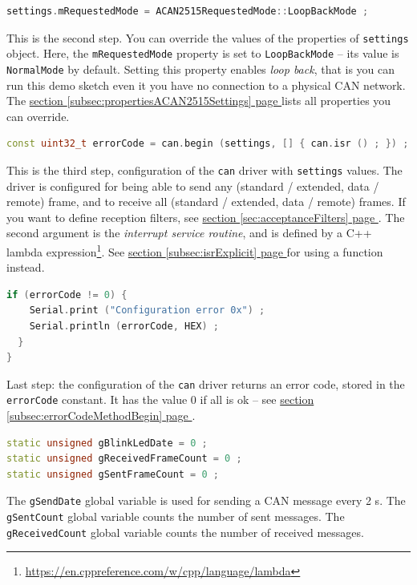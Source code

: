 \documentclass[10pt, a4paper, obeyspaces, openany]{extarticle}
\newcommand\refSectionPage[1]{\hyperref[sec:#1]{section \ref*{sec:#1} page \pageref{sec:#1}}}
\newcommand\refSubsectionPage[1]{\hyperref[subsec:#1]{section \ref*{subsec:#1} page \pageref{subsec:#1}}}
\begin{document}
{ \small\begin{lstlisting}[language=c++]
  settings.mRequestedMode = ACAN2515RequestedMode::LoopBackMode ;
\end{lstlisting}}
This is the second step. You can override the values of the properties of \texttt{settings} object. Here, the \texttt{mRequestedMode} property is set to \texttt{LoopBackMode} -- its value is \texttt{NormalMode} by default. Setting this property enables \emph{loop back}, that is you can run this demo sketch even it you have no connection to a physical CAN network. The \refSubsectionPage{propertiesACAN2515Settings} lists all properties you can override.





{ \small\begin{lstlisting}[language=c++]
  const uint32_t errorCode = can.begin (settings, [] { can.isr () ; }) ;
\end{lstlisting}}
This is the third step, configuration of the \texttt{can} driver with \texttt{settings} values. The driver is configured for being able to send any (standard / extended, data / remote) frame, and to receive all (standard / extended, data / remote) frames. If you want to define reception filters, see \refSectionPage{acceptanceFilters}. The second argument is the \emph{interrupt service routine}, and is defined by a C++ lambda expression\footnote{\url{https://en.cppreference.com/w/cpp/language/lambda}}. See \refSubsectionPage{isrExplicit} for using a function instead.





{ \small\begin{lstlisting}[language=c++]
  if (errorCode != 0) {
    Serial.print ("Configuration error 0x") ;
    Serial.println (errorCode, HEX) ;
  }
}
\end{lstlisting}}
Last step: the configuration of the \texttt{can} driver returns an error code, stored in the \texttt{errorCode} constant. It has the value $0$ if all is ok -- see \refSubsectionPage{errorCodeMethodBegin}.








{ \small\begin{lstlisting}[language=c++]
static unsigned gBlinkLedDate = 0 ;
static unsigned gReceivedFrameCount = 0 ;
static unsigned gSentFrameCount = 0 ;
\end{lstlisting}}
The \texttt{gSendDate} global variable is used for sending a CAN message every 2 s. The \texttt{gSentCount} global variable counts the number of sent messages. The \texttt{gReceivedCount} global variable counts the number of received messages.
\end{document}
